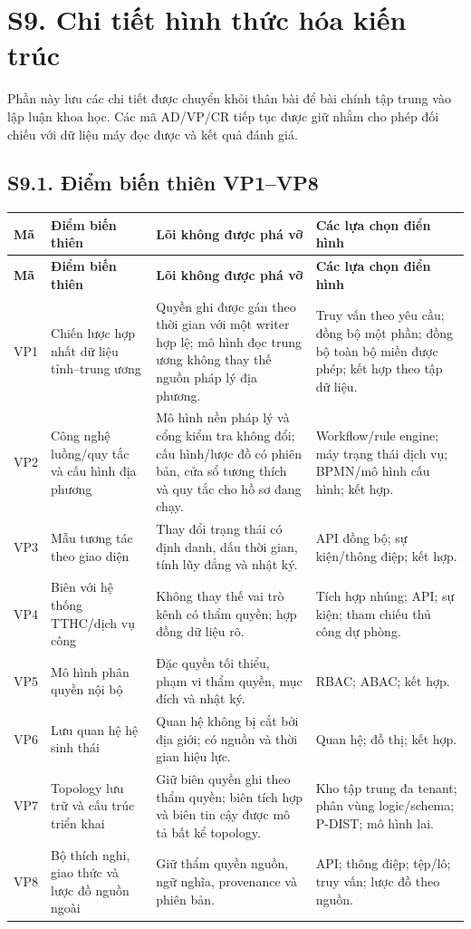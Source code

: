 \documentclass[a4paper,11pt]{article}
\begin{document}
\section*{S9. Chi tiết hình thức hóa kiến trúc}
Phần này lưu các chi tiết được chuyển khỏi thân bài để bài chính tập trung vào lập luận khoa học. Các mã AD/VP/CR tiếp tục được giữ nhằm cho phép đối chiếu với dữ liệu máy đọc được và kết quả đánh giá.

\subsection*{S9.1. Điểm biến thiên VP1--VP8}
\small
\renewcommand{\arraystretch}{1.02}
\setlength{\tabcolsep}{2.2pt}
\begin{longtable}{@{}p{0.75cm}p{3.6cm}p{5.1cm}p{5.5cm}@{}}
\toprule
\textbf{Mã} & \textbf{Điểm biến thiên} & \textbf{Lõi không được phá vỡ} & \textbf{Các lựa chọn điển hình} \\
\midrule
\endfirsthead
\toprule
\textbf{Mã} & \textbf{Điểm biến thiên} & \textbf{Lõi không được phá vỡ} & \textbf{Các lựa chọn điển hình} \\
\midrule
\endhead
\bottomrule
\endfoot
VP1 & Chiến lược hợp nhất dữ liệu tỉnh--trung ương & Quyền ghi được gán theo thời gian với một writer hợp lệ; mô hình đọc trung ương không thay thế nguồn pháp lý địa phương. & Truy vấn theo yêu cầu; đồng bộ một phần; đồng bộ toàn bộ miền được phép; kết hợp theo tập dữ liệu. \\
VP2 & Công nghệ luồng/quy tắc và cấu hình địa phương & Mô hình nền pháp lý và cổng kiểm tra không đổi; cấu hình/lược đồ có phiên bản, cửa sổ tương thích và quy tắc cho hồ sơ đang chạy. & Workflow/rule engine; máy trạng thái dịch vụ; BPMN/mô hình cấu hình; kết hợp. \\
VP3 & Mẫu tương tác theo giao diện & Thay đổi trạng thái có định danh, dấu thời gian, tính lũy đẳng và nhật ký. & API đồng bộ; sự kiện/thông điệp; kết hợp. \\
VP4 & Biên với hệ thống TTHC/dịch vụ công & Không thay thế vai trò kênh có thẩm quyền; hợp đồng dữ liệu rõ. & Tích hợp nhúng; API; sự kiện; tham chiếu thủ công dự phòng. \\
VP5 & Mô hình phân quyền nội bộ & Đặc quyền tối thiểu, phạm vi thẩm quyền, mục đích và nhật ký. & RBAC; ABAC; kết hợp. \\
VP6 & Lưu quan hệ hệ sinh thái & Quan hệ không bị cắt bởi địa giới; có nguồn và thời gian hiệu lực. & Quan hệ; đồ thị; kết hợp. \\
VP7 & Topology lưu trữ và cấu trúc triển khai & Giữ biên quyền ghi theo thẩm quyền; biên tích hợp và biên tin cậy được mô tả bất kể topology. & Kho tập trung đa tenant; phân vùng logic/schema; P-DIST; mô hình lai. \\
VP8 & Bộ thích nghi, giao thức và lược đồ nguồn ngoài & Giữ thẩm quyền nguồn, ngữ nghĩa, provenance và phiên bản. & API; thông điệp; tệp/lô; truy vấn; lược đồ theo nguồn. \\
\end{longtable}
\normalsize
\end{document}
